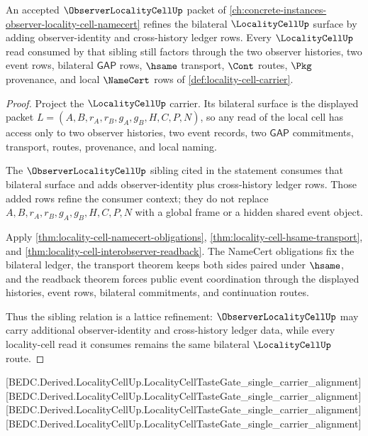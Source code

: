 \begin{theorem}
\label{thm:locality-cell-observerlocalitycell-lattice-link}
An accepted $\ObserverLocalityCellUp$ packet of \autoref{ch:concrete-instances-observer-locality-cell-namecert} refines the bilateral $\LocalityCellUp$ surface by adding observer-identity and cross-history ledger rows. Every $\LocalityCellUp$ read consumed by that sibling still factors through the two observer histories, two event rows, bilateral $\mathsf{GAP}$ rows, $\hsame$ transport, $\Cont$ routes, $\Pkg$ provenance, and local $\NameCert$ rows of \autoref{def:locality-cell-carrier}.
\end{theorem}
\begin{proof}
Project the $\LocalityCellUp$ carrier. Its bilateral surface is the displayed packet $L=(A,B,r_A,r_B,g_A,g_B,H,C,P,N)$, so any read of the local cell has access only to two observer histories, two event records, two $\mathsf{GAP}$ commitments, transport, routes, provenance, and local naming.

The $\ObserverLocalityCellUp$ sibling cited in the statement consumes that bilateral surface and adds observer-identity plus cross-history ledger rows. Those added rows refine the consumer context; they do not replace $A,B,r_A,r_B,g_A,g_B,H,C,P,N$ with a global frame or a hidden shared event object.

Apply \autoref{thm:locality-cell-namecert-obligations}, \autoref{thm:locality-cell-hsame-transport}, and \autoref{thm:locality-cell-interobserver-readback}. The NameCert obligations fix the bilateral ledger, the transport theorem keeps both sides paired under $\hsame$, and the readback theorem forces public event coordination through the displayed histories, event rows, bilateral commitments, and continuation routes.

Thus the sibling relation is a lattice refinement: $\ObserverLocalityCellUp$ may carry additional observer-identity and cross-history ledger data, while every locality-cell read it consumes remains the same bilateral $\LocalityCellUp$ route.
\end{proof}

[BEDC.Derived.LocalityCellUp.LocalityCellTasteGate\_single\_carrier\_alignment]
[BEDC.Derived.LocalityCellUp.LocalityCellTasteGate\_single\_carrier\_alignment]
[BEDC.Derived.LocalityCellUp.LocalityCellTasteGate\_single\_carrier\_alignment]
[BEDC.Derived.LocalityCellUp.LocalityCellTasteGate\_single\_carrier\_alignment]

